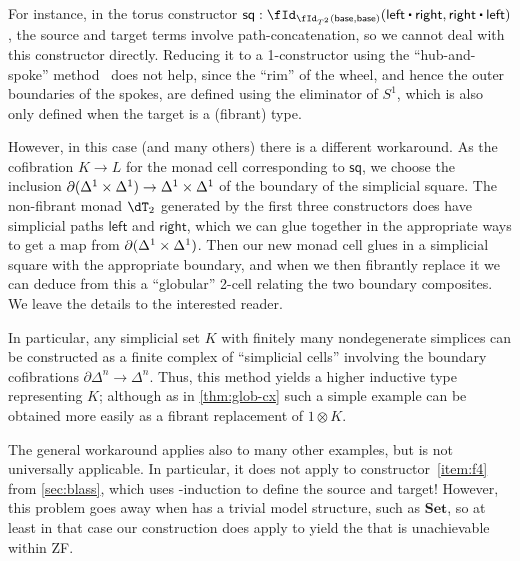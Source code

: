 \documentclass{amsart}
\let\N\iN
\let\sec\S
\let\S\cS
\begin{document}
For instance, in the torus constructor $\mathsf{sq} : \id[{\id[T^2]{\mathsf{base}}{\mathsf{base}}}]{\mathsf{left}\ct\mathsf{right}}{\mathsf{right}\ct\mathsf{left}}$, the source and target terms involve path-concatenation, so we cannot deal with this constructor directly.
Reducing it to a 1-constructor using the ``hub-and-spoke'' method~\cite[\sec6.7]{hottbook} does not help, since the ``rim'' of the wheel, and hence the outer boundaries of the spokes, are defined using the eliminator of $S^1$, which is also only defined when the target is a (fibrant) type.

However, in this case (and many others) there is a different workaround.
As the cofibration $K\to L$ for the monad cell corresponding to $\mathsf{sq}$, we choose the inclusion $\partial({\Delta^1}\times{\Delta^1}) \to {\Delta^1}\times{\Delta^1}$ of the boundary of the simplicial square.
The non-fibrant monad $\dT_2$ generated by the first three constructors does have simplicial paths $\mathsf{left}$ and $\mathsf{right}$, which we can glue together in the appropriate ways to get a map from $\partial({\Delta^1}\times{\Delta^1})$.
Then our new monad cell glues in a simplicial square with the appropriate boundary, and when we then fibrantly replace it we can deduce from this a ``globular'' 2-cell relating the two boundary composites.
We leave the details to the interested reader.

In particular, any simplicial set $K$ with finitely many nondegenerate simplices can be constructed as a finite complex of ``simplicial cells'' involving the boundary cofibrations $\partial\Delta^n \to \Delta^n$.
Thus, this method yields a higher inductive type representing $K$; although as in \cref{thm:glob-cx} such a simple example can be obtained more easily as a fibrant replacement of $1\otimes K$.

The general workaround applies also to many other examples, but is not universally applicable.
In particular, it does not apply to constructor~\ref{item:f4} from \cref{sec:blass}, which uses \N-induction to define the source and target!
However, this problem goes away when \sM has a trivial model structure, such as $\mathbf{Set}$, so at least in that case our construction does apply to yield the \iF that is unachievable within ZF.




\end{document}
